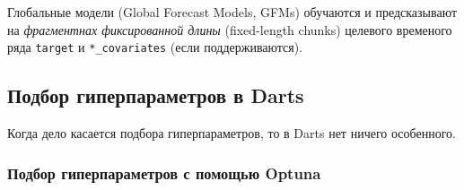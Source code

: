 \documentclass[%
	11pt,
	a4paper,
	utf8,
		]{article}
\begin{document}
Глобальные модели (Global Forecast Models, GFMs) обучаются и предсказывают на \emph{фрагментнах фиксированной длины} (fixed-length chunks) целевого временого ряда \verb|target| и \verb|*_covariates| (если поддерживаются).

\subsection{Подбор гиперпараметров в Darts}

Когда дело касается подбора гиперпараметров, то в Darts нет ничего особенного.

\subsubsection{Подбор гиперпараметров с помощью Optuna}
\end{document}
